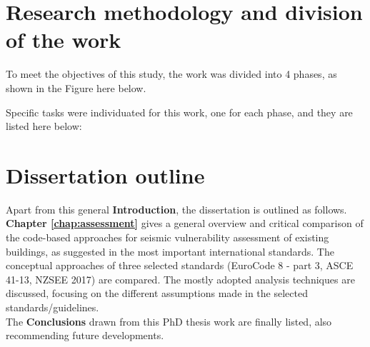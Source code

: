 \section*{Research methodology and division of the work}

To meet the objectives of this study, the work was divided into 4 phases, as shown in the Figure here below. 

Specific tasks were individuated for this work, one for each phase, and they are listed here below:



\section*{Dissertation outline}

Apart from this general \textbf{Introduction}, the dissertation is outlined as follows.\\

\textbf{Chapter \ref{chap:assessment}} gives a general overview and critical comparison of the code-based approaches for seismic vulnerability assessment of existing buildings, as suggested in the most important international standards. The conceptual approaches of three selected standards (EuroCode 8 - part 3, ASCE 41-13, NZSEE 2017) are compared. The mostly adopted analysis techniques are discussed, focusing on the different assumptions made in the selected standards/guidelines. \\

The \textbf{Conclusions} drawn from this PhD thesis work are finally listed, also recommending future developments.

